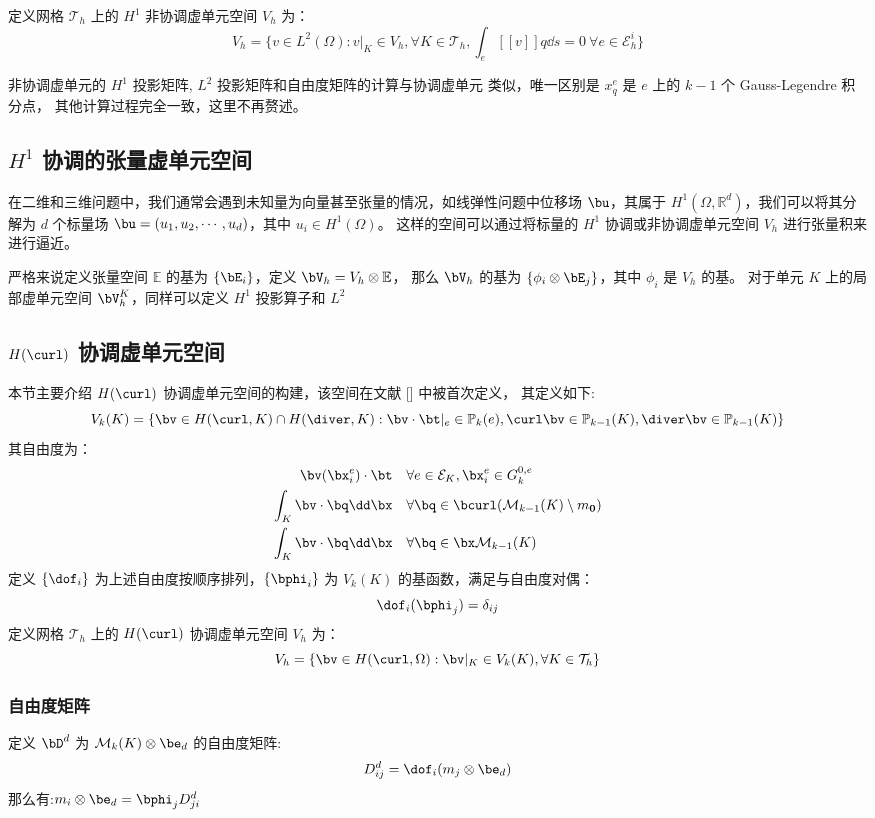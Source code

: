 定义网格 $\mathcal{T}_h$ 上的 $H^1$ 非协调虚单元空间 $V_h$ 为：
$$
V_h = \{v \in L^2(\Omega): v|_K \in V_h, \forall K \in \mathcal{T}_h, 
\int_{e} [\![v ]\!]q \dd s = 0 \ \forall e \in \mathcal{E}^i_h\}
$$

非协调虚单元的 $H^1$ 投影矩阵, $L^2$ 投影矩阵和自由度矩阵的计算与协调虚单元
类似，唯一区别是 $x_q^e$ 是 $e$ 上的 $k-1$ 个 Gauss-Legendre 积分点，
其他计算过程完全一致，这里不再赘述。
\subsection{$H^1$ 协调的张量虚单元空间}
在二维和三维问题中，我们通常会遇到未知量为向量甚至张量的情况，如线弹性问题中位移场
$\bu$，其属于 $H^1(\Omega, \mathbb{R}^d)$，我们可以将其分解为 $d$ 个标量场
$\bu = (u_1, u_2, \cdots, u_d)$，其中 $u_i \in H^1(\Omega)$。
这样的空间可以通过将标量的 $H^1$ 协调或非协调虚单元空间 $V_h$
进行张量积来进行逼近。

严格来说定义张量空间 $\mathbb{E}$ 的基为 $\{\bE_i\}$，定义 $\bV_h = V_h\otimes
\mathbb{E}$，
那么 $\bV_h$ 的基为 $\{\phi_i \otimes \bE_j\}$，其中 $\phi_i$ 是 $V_h$ 的基。
对于单元 $K$ 上的局部虚单元空间 $\bV_h^K$，同样可以定义 $H^1$ 投影算子和 $L^2$


\subsection{$H(\curl)$ 协调虚单元空间}
本节主要介绍 $H(\curl)$ 协调虚单元空间的构建，该空间在文献 [] 中被首次定义，
其定义如下:
$$
V_k(K) = \{\bv \in H(\curl, K)\cap H(\diver, K): \bv\cdot \bt|_{e} \in
\mathbb{P}_k(e), \curl \bv \in \mathbb{P}_{k-1}(K), 
\diver \bv \in \mathbb{P}_{k-1}(K)\}
$$
其自由度为：
\begin{align}
    \bv(\bx_i^e)\cdot \bt & \quad \forall e \in \mathcal{E}_K, \bx_i^e\in G^{0, e}_k\\
    \int_K \bv \cdot \bq \dd \bx & \quad \forall \bq \in
    \bcurl(\mathcal{M}_{k-1}(K)\setminus m_{\boldsymbol{0}})\\
    \int_K \bv \cdot \bq \dd \bx & \quad \forall \bq \in
    \bx\mathcal{M}_{k-1}(K)
\end{align}
定义 $\{\dof_i\}$ 为上述自由度按顺序排列，$\{\bphi_i\}$ 为 $V_k(K)$
的基函数，满足与自由度对偶：
$$
\dof_i(\bphi_j) = \delta_{ij}
$$
定义网格 $\mathcal{T}_h$ 上的 $H(\curl)$ 协调虚单元空间 $V_h$ 为：
$$
V_h = \{\bv \in H(\curl, \Omega): \bv|_K \in V_k(K), \forall K \in \mathcal{T}_h\}
$$
\subsubsection{自由度矩阵}
定义 $\bD^d$ 为 $\mathcal{M}_k(K) \otimes \be_d$ 的自由度矩阵:
$$
D_{ij}^d = \dof_i(m_j\otimes \be_d)
$$
那么有:$m_i\otimes \be_d = \bphi_j D_{ji}^d$
